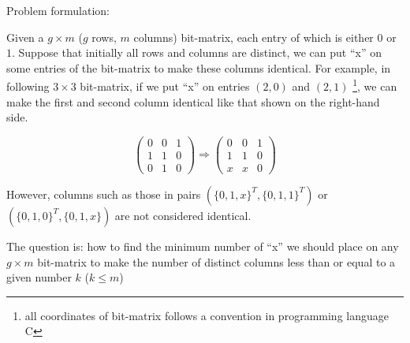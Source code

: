 
Problem formulation:

Given a $g \times m$ ($g$ rows, $m$ columns) bit-matrix, each entry of
which is either $0$ or $1$. Suppose that initially all rows and columns
are distinct, we can put ``x'' on some entries of the bit-matrix to
make these columns identical. For example, in following $3 \times 3$
bit-matrix, if we put ``x'' on entries $(2, 0)$ and $(2, 1)$ \footnote{
all coordinates of bit-matrix follows a convention in programming language
{C}}, we can make the first and second column identical like that shown
on the right-hand side.

\[ 
\begin{pmatrix} 
0 & 0 & 1 \\ 
1 & 1 & 0 \\ 
0 & 1 & 0 
\end{pmatrix}
\Longrightarrow 
\begin{pmatrix} 
0 & 0 & 1 \\ 
1 & 1 & 0 \\ 
x & x & 0 
\end{pmatrix} 
\]

However, columns such as those in pairs $(\{0, 1, x\}^T, \{0, 1, 1\}^T)$ 
or $(\{0, 1, 0\}^T, \{0, 1, x\})$ are not considered identical.

The question is: how to find the minimum number of ``x'' we should place
on any $g \times m$ bit-matrix to make the number of distinct columns
less than or equal to a given number $k$ ($k \leq m$) 
    


